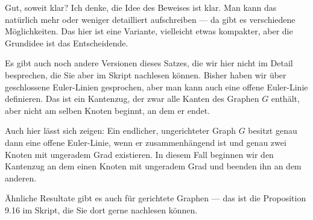 \begin{spoken-clean}[00:17:28 - 00:18:56]
Gut, soweit klar? Ich denke, die Idee des Beweises ist klar. Man kann das natürlich mehr oder weniger detailliert aufschreiben --- da gibt es verschiedene Möglichkeiten. Das hier ist eine Variante, vielleicht etwas kompakter, aber die Grundidee ist das Entscheidende.

Es gibt auch noch andere Versionen dieses Satzes, die wir hier nicht im Detail besprechen, die Sie aber im Skript nachlesen können. Bisher haben wir über geschlossene Euler-Linien gesprochen, aber man kann auch eine offene Euler-Linie definieren. Das ist ein Kantenzug, der zwar alle Kanten des Graphen $G$ enthält, aber nicht am selben Knoten beginnt, an dem er endet.

Auch hier lässt sich zeigen: Ein endlicher, ungerichteter Graph $G$ besitzt genau dann eine offene Euler-Linie, wenn er zusammenhängend ist und genau zwei Knoten mit ungeradem Grad existieren. In diesem Fall beginnen wir den Kantenzug an dem einen Knoten mit ungeradem Grad und beenden ihn an dem anderen.
\end{spoken-clean}

\begin{math-stroke}

\end{math-stroke}

\begin{spoken-clean}[00:18:56 - 00:20:20]
Ähnliche Resultate gibt es auch für gerichtete Graphen --- das ist die Proposition 9.16 im Skript, die Sie dort gerne nachlesen können.
\end{spoken-clean}

\begin{math-stroke}
\end{math-stroke}

